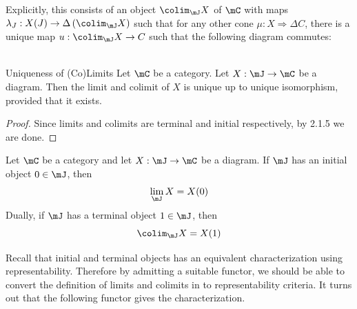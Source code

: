 \documentclass[a4paper]{article}
\begin{document}
Explicitly, this consists of an object $\colim_\mJ X$ of $\mC$ with maps $\lambda_J:X(J)\to\Delta\left(\colim_\mJ X\right)$ such that for any other cone $\mu:X\Rightarrow\Delta C$, there is a unique map $u:\colim_\mJ X\to C$ such that the following diagram commutes: \\
\\

\begin{prp}{Uniqueness of (Co)Limits}{} Let $\mC$ be a category. Let $X:\mJ\to\mC$ be a diagram. Then the limit and colimit of $X$ is unique up to unique isomorphism, provided that it exists. 
\begin{proof}
Since limits and colimits are terminal and initial respectively, by 2.1.5 we are done. 
\end{proof}
\end{prp}

\begin{prp}{}{} Let $\mC$ be a category and let $X:\mJ\to\mC$ be a diagram. If $\mJ$ has an initial object $0\in\mJ$, then $$\lim_\mJ X=X(0)$$ Dually, if $\mJ$ has a terminal object $1\in\mJ$, then $$\colim_\mJ X=X(1)$$
\end{prp}

Recall that initial and terminal objects has an equivalent characterization using representability. Therefore by admitting a suitable functor, we should be able to convert the definition of limits and colimits in to representability criteria. It turns out that the following functor gives the characterization. 
\end{document}
